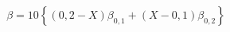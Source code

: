 \documentclass[12pt]{article}
\begin{document}
\begin{displaymath}
\beta = 10 \left\{ \left( 0,2 - X \right) \beta_{0,1} + \left( X - 0,1 \right) \beta_{0,2} \right\}
\end{displaymath}
\end{document}
